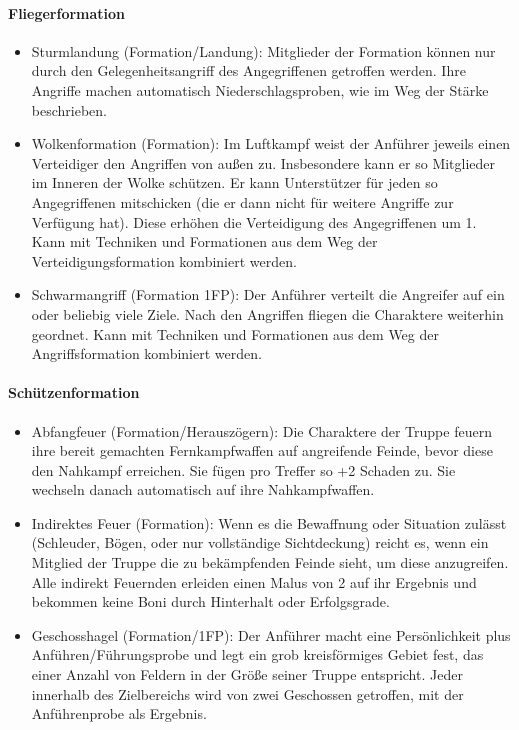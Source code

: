 \documentclass{article}
\begin{document}
\paragraph{Fliegerformation}

\begin{itemize}
\item Sturmlandung (Formation/Landung): Mitglieder der Formation können nur durch den Gelegenheitsangriff des Angegriffenen getroffen werden. Ihre Angriffe machen automatisch Niederschlagsproben, wie im Weg der Stärke beschrieben.
\item Wolkenformation (Formation): Im Luftkampf weist der Anführer jeweils einen Verteidiger den Angriffen von außen zu. Insbesondere kann er so Mitglieder im Inneren der Wolke schützen. Er kann Unterstützer für jeden so Angegriffenen mitschicken (die er dann nicht für weitere Angriffe zur Verfügung hat). Diese erhöhen die Verteidigung des Angegriffenen um 1. Kann mit Techniken und Formationen aus dem Weg der Verteidigungsformation kombiniert werden.
\item Schwarmangriff (Formation 1FP): Der Anführer verteilt die Angreifer auf ein oder beliebig viele Ziele. Nach den Angriffen fliegen die Charaktere weiterhin geordnet. Kann mit Techniken und Formationen aus dem Weg der Angriffsformation kombiniert werden.
\end{itemize}

\paragraph{Schützenformation}

\begin{itemize}
\item Abfangfeuer (Formation/Herauszögern): Die Charaktere der Truppe feuern ihre bereit gemachten Fernkampfwaffen auf angreifende Feinde, bevor diese den Nahkampf erreichen. Sie fügen pro Treffer so +2 Schaden zu. Sie wechseln danach automatisch auf ihre Nahkampfwaffen.
\item Indirektes Feuer (Formation): Wenn es die Bewaffnung oder Situation zulässt (Schleuder, Bögen, oder nur vollständige Sichtdeckung) reicht es, wenn ein Mitglied der Truppe die zu bekämpfenden Feinde sieht, um diese anzugreifen. Alle indirekt Feuernden erleiden einen Malus von 2 auf ihr Ergebnis und bekommen keine Boni durch Hinterhalt oder Erfolgsgrade.
\item Geschosshagel (Formation/1FP): Der Anführer macht eine Persönlichkeit plus Anführen/Führungsprobe und legt ein grob kreisförmiges Gebiet fest, das einer Anzahl von Feldern in der Größe seiner Truppe entspricht. Jeder innerhalb des Zielbereichs wird von zwei Geschossen getroffen, mit der Anführenprobe als Ergebnis.
\end{itemize}
\end{document}
